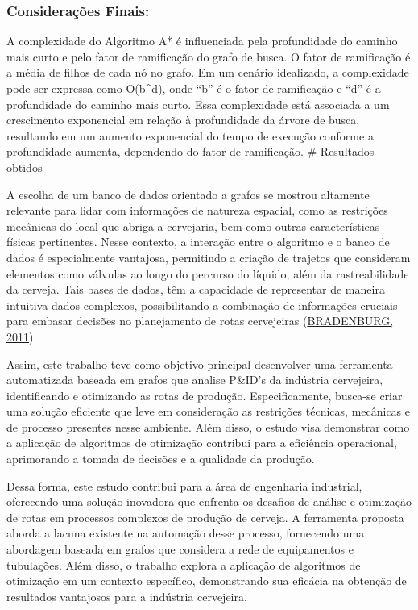 \subsubsection{Considerações Finais:}\label{considerauxe7uxf5es-finais}

A complexidade do Algoritmo A* é influenciada pela profundidade do
caminho mais curto e pelo fator de ramificação do grafo de busca. O
fator de ramificação é a média de filhos de cada nó no grafo. Em um
cenário idealizado, a complexidade pode ser expressa como O(b\^{}d),
onde ``b'' é o fator de ramificação e ``d'' é a profundidade do caminho
mais curto. Essa complexidade está associada a um crescimento
exponencial em relação à profundidade da árvore de busca, resultando em
um aumento exponencial do tempo de execução conforme a profundidade
aumenta, dependendo do fator de ramificação. \# Resultados obtidos

A escolha de um banco de dados orientado a grafos se mostrou altamente
relevante para lidar com informações de natureza espacial, como as
restrições mecânicas do local que abriga a cervejaria, bem como outras
características físicas pertinentes. Nesse contexto, a interação entre o
algoritmo e o banco de dados é especialmente vantajosa, permitindo a
criação de trajetos que consideram elementos como válvulas ao longo do
percurso do líquido, além da rastreabilidade da cerveja. Tais bases de
dados, têm a capacidade de representar de maneira intuitiva dados
complexos, possibilitando a combinação de informações cruciais para
embasar decisões no planejamento de rotas cervejeiras
(\hyperref[referuxeancias-bibliogruxe1ficas]{BRADENBURG, 2011}).

Assim, este trabalho teve como objetivo principal desenvolver uma
ferramenta automatizada baseada em grafos que analise P\&ID's da
indústria cervejeira, identificando e otimizando as rotas de produção.
Especificamente, busca-se criar uma solução eficiente que leve em
consideração as restrições técnicas, mecânicas e de processo presentes
nesse ambiente. Além disso, o estudo visa demonstrar como a aplicação de
algoritmos de otimização contribui para a eficiência operacional,
aprimorando a tomada de decisões e a qualidade da produção.

Dessa forma, este estudo contribui para a área de engenharia industrial,
oferecendo uma solução inovadora que enfrenta os desafios de análise e
otimização de rotas em processos complexos de produção de cerveja. A
ferramenta proposta aborda a lacuna existente na automação desse
processo, fornecendo uma abordagem baseada em grafos que considera a
rede de equipamentos e tubulações. Além disso, o trabalho explora a
aplicação de algoritmos de otimização em um contexto específico,
demonstrando sua eficácia na obtenção de resultados vantajosos para a
indústria cervejeira.

